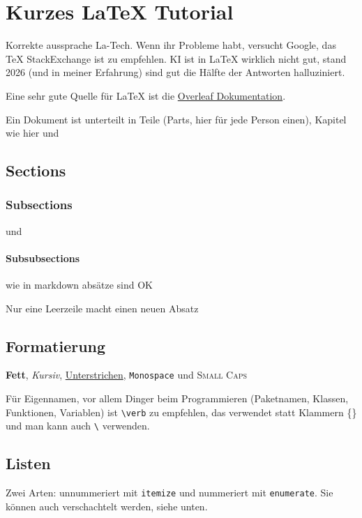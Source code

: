 \chapter{Kurzes \LaTeX{} Tutorial}

Korrekte aussprache La-Tech. Wenn ihr Probleme habt, versucht Google, das TeX StackExchange ist zu empfehlen. KI ist in LaTeX wirklich nicht gut, stand 2026 (und in meiner Erfahrung) sind gut die Hälfte der Antworten halluziniert.

Eine sehr gute Quelle für \LaTeX{} ist die \href{https://www.overleaf.com/learn/latex}{Overleaf Dokumentation}.

Ein Dokument ist unterteilt in Teile (Parts, hier für jede Person einen), Kapitel wie hier und

\section{Sections}

\subsection{Subsections}

und

\subsubsection{Subsubsections}

wie in markdown
absätze sind OK

Nur eine Leerzeile macht einen neuen Absatz

\section{Formatierung}

\textbf{Fett}, \textit{Kursiv}, \underline{Unterstrichen}, \texttt{Monospace} und \textsc{Small Caps}

Für Eigennamen, vor allem Dinger beim Programmieren (Paketnamen, Klassen, Funktionen, Variablen) ist \verb|\verb| zu empfehlen, das verwendet \textbar\textbar{} statt Klammern \{\} und man kann auch \verb|\| verwenden.

\section{Listen}

Zwei Arten: unnummeriert mit \verb|itemize| und nummeriert mit \verb|enumerate|. Sie können auch verschachtelt werden, siehe unten.

